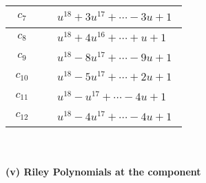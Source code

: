 \documentclass[1p]{elsarticle_modified}
\theoremstyle{definition}
\begin{document}
\begin{tabular}{m{50pt}|m{274pt}}
\hline $$\begin{aligned}c_{7}\end{aligned}$$&$\begin{aligned}
&u^{18}+3 u^{17}+\cdots-3 u+1
\end{aligned}$\\
\hline $$\begin{aligned}c_{8}\end{aligned}$$&$\begin{aligned}
&u^{18}+4 u^{16}+\cdots+u+1
\end{aligned}$\\
\hline $$\begin{aligned}c_{9}\end{aligned}$$&$\begin{aligned}
&u^{18}-8 u^{17}+\cdots-9 u+1
\end{aligned}$\\
\hline $$\begin{aligned}c_{10}\end{aligned}$$&$\begin{aligned}
&u^{18}-5 u^{17}+\cdots+2 u+1
\end{aligned}$\\
\hline $$\begin{aligned}c_{11}\end{aligned}$$&$\begin{aligned}
&u^{18}- u^{17}+\cdots-4 u+1
\end{aligned}$\\
\hline $$\begin{aligned}c_{12}\end{aligned}$$&$\begin{aligned}
&u^{18}-4 u^{17}+\cdots-4 u+1
\end{aligned}$\\
\hline
\end{tabular}\\~\\
\newpage\renewcommand{\arraystretch}{1}
\flushleft \textbf{(v) Riley Polynomials at the component}\newline \\
\end{document}
